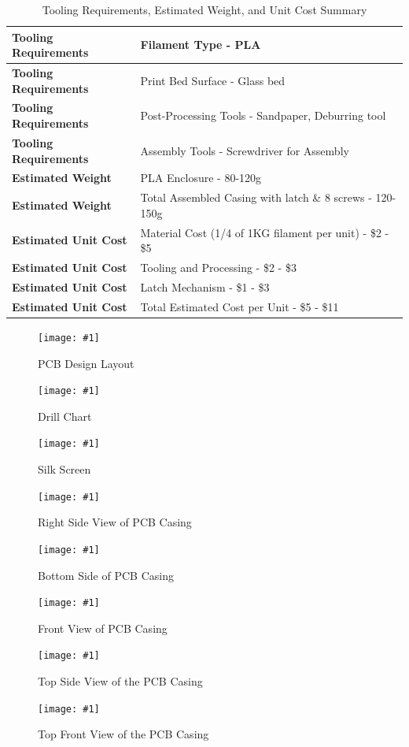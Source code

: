 \documentclass[12pt]{article}
\newcommand{\quickfigure}[4]{%
\begin{figure}[!htbp]
\centering
\texttt{[image: \#1]}
\caption{#3}
\label{#4}
\end{figure}%
}
\begin{document}
\begin{table}[h!]
\centering
\begin{tabular}{|l|l|}
\hline
\textbf{Tooling Requirements} & Filament Type - PLA \\ \hline
\textbf{Tooling Requirements} & Print Bed Surface - Glass bed \\ \hline
\textbf{Tooling Requirements} & Post-Processing Tools - Sandpaper, Deburring tool \\ \hline
\textbf{Tooling Requirements} & Assembly Tools - Screwdriver for Assembly \\ \hline
\textbf{Estimated Weight} & PLA Enclosure - 80-120g \\ \hline
\textbf{Estimated Weight} & Total Assembled Casing with latch \& 8 screws - 120-150g \\ \hline
\textbf{Estimated Unit Cost} & Material Cost (1/4 of 1KG filament per unit) - \$2 - \$5 \\ \hline
\textbf{Estimated Unit Cost} & Tooling and Processing - \$2 - \$3 \\ \hline
\textbf{Estimated Unit Cost} & Latch Mechanism - \$1 - \$3 \\ \hline
\textbf{Estimated Unit Cost} & Total Estimated Cost per Unit - \$5 - \$11 \\ \hline
\end{tabular}
\caption{Tooling Requirements, Estimated Weight, and Unit Cost Summary}
\label{tab:tooling_costs}
\end{table}

\newpage
\quickfigure{pcb-design-layout.png}{15cm}{PCB Design Layout}{pcb-design-layout}

\quickfigure{images/drill-chart.png}{15cm}{Drill Chart}{drill-chart}

\quickfigure{images/silk-screen.png}{15cm}{Silk Screen}{silk-screen}

\quickfigure{images/right-side-of-PCB-casing.png}{15cm}{Right Side View of PCB Casing}{right-side-view-pcb-casing}

\quickfigure{images/bottom-side-of-PCB-casing.png}{15cm}{Bottom Side of PCB Casing}{bottom-side-pcb-casing}

\quickfigure{images/front-view-of-PCB-casing.png}{15cm}{Front View of PCB Casing}{front-view-pcb-casing}

\quickfigure{images/top-view-PCB-casing-open.png}{15cm}{Top Side View of the PCB Casing}{top-side-view-pcb-casing}

\quickfigure{images/top-front-view-PCB-casing-open.png}{15cm}{Top Front View of the PCB Casing}{top-front-view-pcb-casing}
\end{document}
